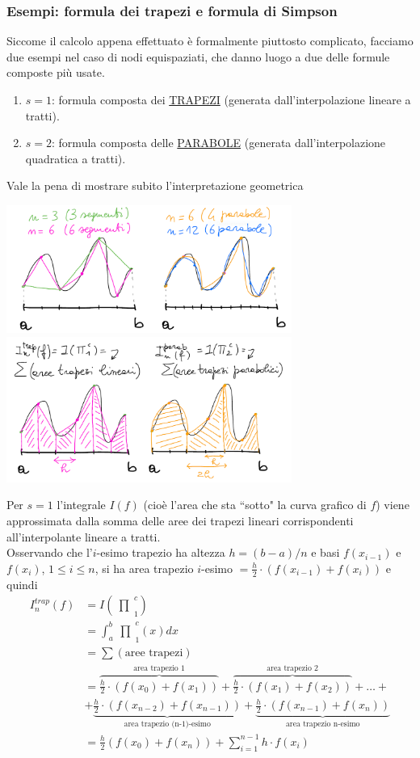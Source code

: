 \documentclass[12pt,a4paper]{article}
\newcommand{\inter}{\begin{matrix}\prod\end{matrix}}
\begin{document}
\subsubsection{Esempi: formula dei trapezi e formula di Simpson}
Siccome il calcolo appena effettuato è formalmente piuttosto complicato, facciamo due esempi nel caso di nodi equispaziati, che danno luogo a due delle formule composte più usate.
\begin{enumerate}
    \item $s=1$: formula composta dei \uline{TRAPEZI} (generata dall'interpolazione lineare a tratti).
    \item $s=2$: formula composta delle \uline{PARABOLE} (generata dall'interpolazione quadratica a tratti).
\end{enumerate}
Vale la pena di mostrare subito l'interpretazione geometrica
\begin{center}
    \includegraphics[width=0.7\textwidth]{pag17.png}
    \includegraphics[width=0.7\textwidth]{pag18.png}
\end{center}
Per $s=1$ l'integrale $I(f)$ (cioè l'area che sta ``sotto" la curva grafico di $f$) viene approssimata dalla somma delle aree dei trapezi lineari corrispondenti all'interpolante lineare a tratti.\\
Osservando che l'$i$-esimo trapezio ha altezza $h=(b-a)/n$ e basi $f(x_{i-1})$ e $f(x_i)$, $1 \leq i \leq n$, si ha area trapezio $i$-esimo $= \frac{h}{2} \cdot (f(x_{i-1}) + f(x_i))$ e quindi
\[
\begin{split}
    I_n^{trap} (f) & = I(\inter_1^c) \\
    & = \int_a^b \inter_1^c (x) dx \\
    & = \sum (\text{aree trapezi}) \\
    & = \overbrace{\frac{h}{2} \cdot (f(x_0) + f(x_1))}^{\text{area trapezio 1}} + \overbrace{\frac{h}{2} \cdot (f(x_1) + f(x_2))}^{\text{area trapezio 2}} + \dotso + \\
    & + \underbrace{\frac{h}{2} \cdot (f(x_{n-2}) + f(x_{n-1}))}_{\text{area trapezio (n-1)-esimo}} + \underbrace{\frac{h}{2} \cdot (f(x_{n-1}) + f(x_n))}_{\text{area trapezio n-esimo}} \\ 
    & =\frac{h}{2} (f(x_0) + f(x_n)) + \sum_{i=1}^{n-1} h \cdot f(x_i)
\end{split}
\]
\end{document}
